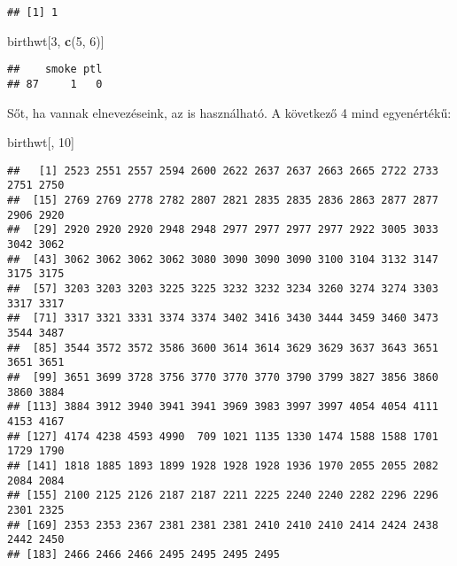 \documentclass[]{book}
\newenvironment{Shaded}{\begin{snugshade}}{\end{snugshade}}
\newcommand{\KeywordTok}[1]{\textcolor[rgb]{0.13,0.29,0.53}{\textbf{#1}}}
\newcommand{\DecValTok}[1]{\textcolor[rgb]{0.00,0.00,0.81}{#1}}
\newcommand{\OperatorTok}[1]{\textcolor[rgb]{0.81,0.36,0.00}{\textbf{#1}}}
\newcommand{\NormalTok}[1]{#1}
\begin{document}
\begin{verbatim}
## [1] 1
\end{verbatim}

\begin{Shaded}
\begin{Highlighting}[]
\NormalTok{birthwt[}\DecValTok{3}\NormalTok{, }\KeywordTok{c}\NormalTok{(}\DecValTok{5}\NormalTok{, }\DecValTok{6}\NormalTok{)]}
\end{Highlighting}
\end{Shaded}

\begin{verbatim}
##    smoke ptl
## 87     1   0
\end{verbatim}

Sőt, ha vannak elnevezéseink, az is használható. A következő 4 mind
egyenértékű:

\begin{Shaded}
\begin{Highlighting}[]
\NormalTok{birthwt[, }\DecValTok{10}\NormalTok{]}
\end{Highlighting}
\end{Shaded}

\begin{verbatim}
##   [1] 2523 2551 2557 2594 2600 2622 2637 2637 2663 2665 2722 2733 2751 2750
##  [15] 2769 2769 2778 2782 2807 2821 2835 2835 2836 2863 2877 2877 2906 2920
##  [29] 2920 2920 2920 2948 2948 2977 2977 2977 2977 2922 3005 3033 3042 3062
##  [43] 3062 3062 3062 3062 3080 3090 3090 3090 3100 3104 3132 3147 3175 3175
##  [57] 3203 3203 3203 3225 3225 3232 3232 3234 3260 3274 3274 3303 3317 3317
##  [71] 3317 3321 3331 3374 3374 3402 3416 3430 3444 3459 3460 3473 3544 3487
##  [85] 3544 3572 3572 3586 3600 3614 3614 3629 3629 3637 3643 3651 3651 3651
##  [99] 3651 3699 3728 3756 3770 3770 3770 3790 3799 3827 3856 3860 3860 3884
## [113] 3884 3912 3940 3941 3941 3969 3983 3997 3997 4054 4054 4111 4153 4167
## [127] 4174 4238 4593 4990  709 1021 1135 1330 1474 1588 1588 1701 1729 1790
## [141] 1818 1885 1893 1899 1928 1928 1928 1936 1970 2055 2055 2082 2084 2084
## [155] 2100 2125 2126 2187 2187 2211 2225 2240 2240 2282 2296 2296 2301 2325
## [169] 2353 2353 2367 2381 2381 2381 2410 2410 2410 2414 2424 2438 2442 2450
## [183] 2466 2466 2466 2495 2495 2495 2495
\end{verbatim}

\begin{Shaded}
\end{Shaded}
\end{document}
